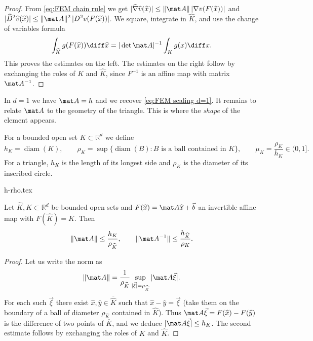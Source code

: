 \begin{proof}
    From \eqref{eq:FEM chain rule} we get $| \widehat \nabla \widehat v (\widehat x) | \le \| \mat A \|\, | \nabla v (F(\widehat x)) |$ and $| \widehat D^2 \widehat v (\widehat x) | \le \| \mat A \|^2\, | D^2 v (F(\widehat x)) |$.
    We square, integrate in $\widehat K$, and use the change of variables formula
    \begin{equation*}
        \int_{\widehat K} g (F(\widehat x)) \diff \widehat x = |\det \mat A|^{-1} \int_K g(x) \diff x .
    \end{equation*}
    This proves the estimates on the left. The estimates on the right follow by exchanging the roles of $K$ and $\widehat K$, since $F^{-1}$ is an affine map with matrix $\mat A^{-1}$.
\end{proof}
In $d = 1$ we have $\mat A = h$ and we recover \eqref{eq:FEM scaling d=1}.
It remains to relate $\mat A$ to the geometry of the triangle. This is where the \emph{shape} of the element appears.
\begin{definition}
    \label{def:FEM size and shape}
    For a bounded open set $K \subset \mathbb R^d$ we define
    \begin{equation*}
        h_K = \operatorname{diam}(K) ,
        \qquad
        \rho_K = \sup \{\operatorname{diam}(B) :  B \text{ is a ball contained in } K \},
        \qquad
        \mu_K = \frac{\rho_K}{h_K} \in (0,1].
    \end{equation*}
    For a triangle, $h_K$ is the length of its longest side and $\rho_K$ is the diameter of its inscribed circle.
\end{definition}
\begin{center}
    {h-rho.tex}
\end{center}
\begin{lemma}
    \label{lem:FEM affine matrix norm}
    Let $\widehat K, K \subset \mathbb R^d$ be bounded open sets and $F(\widehat x) = \mat A \widehat x + \vec b$ an invertible affine map with $F(\widehat K) = K$. Then
    \begin{equation*}
        \| \mat A \| \le \frac{h_{K}}{\rho_{\widehat K}},
        \qquad
        \| \mat A^{-1} \| \le \frac{h_{\widehat K}}{\rho_{K}}.
    \end{equation*}
\end{lemma}
\begin{proof}
    Let us write the norm as
    \begin{equation*}
        \| \mat A \| = \frac 1 {\rho_{\widehat K}} \sup_{|\vec \xi| = \rho_{\widehat K}} |\mat A \vec \xi|.
    \end{equation*}
    For each such $\vec \xi$ there exist $\widehat x, \widehat y \in \overline{\widehat K}$ such that $\widehat x - \widehat y = \vec \xi$ (take them on the boundary of a ball of diameter $\rho_{\widehat K}$ contained in $\widehat K$). Thus $\mat A \vec \xi = F(\widehat x) - F(\widehat y)$ is the difference of two points of $\overline K$, and we deduce $|\mat A \vec \xi| \le h_K$.
    The second estimate follows by exchanging the roles of $K$ and $\widehat K$.
\end{proof}

